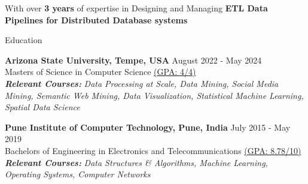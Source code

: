 \documentclass{resume} %
\begin{document}
\quad \quad \quad With over \textbf{3 years} of expertise in Designing and Managing \textbf{ETL Data Pipelines for Distributed Database systems}

\begin{rSection}{Education}

\textbf{{Arizona State University, Tempe, USA}} \hfill {August 2022 - May 2024} \\ 
Masters of Science in Computer Science \href{https://drive.google.com/file/d/1CBoVt4rgM3gzX-zR2J2ZyE9mspKE_VHk/view?usp=share_link}{(GPA: 4/4)} \smallskip \\ 
\textbf{\textit{Relevant Courses:}}
\textit{Data Processing at Scale, Data Mining, Social Media Mining, Semantic Web Mining, Data Visualization, Statistical Machine Learning, Spatial Data Science}

{\bf Pune Institute of Computer Technology, Pune, India} \hfill {July 2015 - May 2019} \\ 
Bachelors of Engineering in Electronics and Telecommunications \href{https://drive.google.com/file/d/1rnGGrkzzwtw6rxbOWBZM7GFE1_JE4Qln/view}{(GPA: 8.78/10)} \smallskip 
\\
\textbf{\textit{Relevant Courses:}}
\textit{Data Structures \& Algorithms, Machine Learning, Operating Systems, Computer Networks}

\end{rSection}

\end{document}
